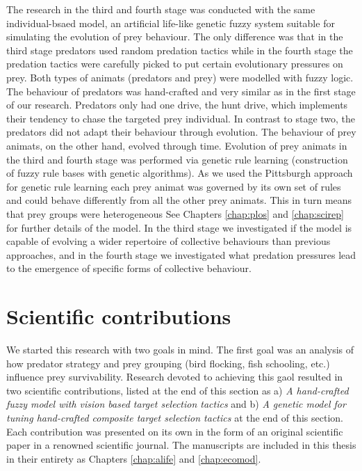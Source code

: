 The research in the third and fourth stage was conducted with the same individual-bsaed model, an artificial life-like genetic fuzzy system suitable for simulating the evolution of prey behaviour. The only difference was that in the third stage predators used random predation tactics while in the fourth stage the predation tactics were carefully picked to put certain evolutionary pressures on prey. Both types of animats (predators and prey) were modelled with fuzzy logic. The behaviour of predators was hand-crafted and very similar as in the first stage of our research. Predators only had one drive, the hunt drive, which implements their tendency to chase the targeted prey individual. In contrast to stage two, the predators did not adapt their behaviour through evolution. The behaviour of prey animats, on the other hand, evolved through time. Evolution of prey animats in the third and fourth stage was performed via genetic rule learning (construction of fuzzy rule bases with genetic algorithms). As we used the Pittsburgh approach for genetic rule learning each prey animat was governed by its own set of rules and could behave differently from all the other prey animats. This in turn means that prey groups were heterogeneous See Chapters \ref{chap:plos} and \ref{chap:scirep} for further details of the model. In the third stage we investigated if the model is capable of evolving a wider repertoire of collective behaviours than previous approaches, and in the fourth stage we investigated what predation pressures lead to the emergence of specific forms of collective behaviour.

\section{Scientific contributions}

We started this research with two goals in mind. The first goal was an analysis of how predator strategy and prey grouping (\eg bird flocking, fish schooling, etc.) influence prey survivability. Research devoted to achieving this gaol resulted in two scientific contributions, listed at the end of this section as a) \emph{A hand-crafted fuzzy model with vision based target selection tactics} and b) \emph{A genetic model for tuning hand-crafted composite target selection tactics} at the end of this section. Each contribution was presented on its own in the form of an original scientific paper in a renowned scientific journal. The manuscripts are included in this thesis in their entirety as Chapters \ref{chap:alife} and \ref{chap:ecomod}.

